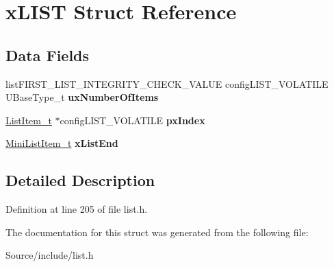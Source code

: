 \hypertarget{structx_l_i_s_t}{}\section{x\+L\+I\+S\+T Struct Reference}
\label{structx_l_i_s_t}
\subsection*{Data Fields}
\begin{DoxyCompactItemize}
\item 
\hypertarget{structx_l_i_s_t_a17b9828dd40520fcda9127b4cb4c0c0c}{}list\+F\+I\+R\+S\+T\+\_\+\+L\+I\+S\+T\+\_\+\+I\+N\+T\+E\+G\+R\+I\+T\+Y\+\_\+\+C\+H\+E\+C\+K\+\_\+\+V\+A\+L\+U\+E config\+L\+I\+S\+T\+\_\+\+V\+O\+L\+A\+T\+I\+L\+E U\+Base\+Type\+\_\+t {\bfseries ux\+Number\+Of\+Items}\label{structx_l_i_s_t_a17b9828dd40520fcda9127b4cb4c0c0c}

\item 
\hypertarget{structx_l_i_s_t_ae8639154918acc3f75d718480322aa82}{}\hyperlink{structx_l_i_s_t___i_t_e_m}{List\+Item\+\_\+t} $\ast$config\+L\+I\+S\+T\+\_\+\+V\+O\+L\+A\+T\+I\+L\+E {\bfseries px\+Index}\label{structx_l_i_s_t_ae8639154918acc3f75d718480322aa82}

\item 
\hypertarget{structx_l_i_s_t_a83a65be4e3a2bb70855742896126bf63}{}\hyperlink{structx_m_i_n_i___l_i_s_t___i_t_e_m}{Mini\+List\+Item\+\_\+t} {\bfseries x\+List\+End}\label{structx_l_i_s_t_a83a65be4e3a2bb70855742896126bf63}

\end{DoxyCompactItemize}


\subsection{Detailed Description}


Definition at line 205 of file list.\+h.



The documentation for this struct was generated from the following file\+:\begin{DoxyCompactItemize}
\item 
Source/include/list.\+h\end{DoxyCompactItemize}
